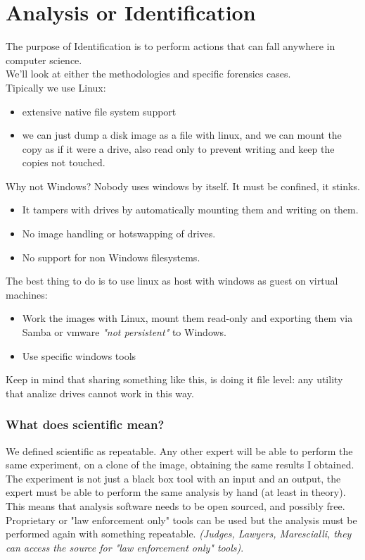 \chapter{Analysis or Identification}
    The purpose of Identification is to perform actions that can fall anywhere in computer science.\\
    We'll look at either the methodologies and specific forensics cases.\\
    Tipically we use Linux:
    \begin{itemize}
        \item extensive native file system support 
        \item we can just dump a disk image as a file with linux, and we can mount the copy as if it were a drive, also read only to prevent writing and keep the copies not touched.
    \end{itemize}
    Why not Windows? Nobody uses windows by itself. It must be confined, it stinks.
    \begin{itemize}
        \item It tampers with drives by automatically mounting them and writing on them.
        \item No image handling or hotswapping of drives.
        \item No support for non Windows filesystems.
    \end{itemize}
    The best thing to do is to use linux as host with windows as guest on virtual machines:
    \begin{itemize}
        \item Work the images with Linux, mount them read-only and exporting them via Samba or vmware \textit{"not persistent"} to Windows.
        \item Use specific windows tools
    \end{itemize}
    Keep in mind that sharing something like this, is doing it file level: any utility that analize drives cannot work in this way.
    \subsection{What does scientific mean?}
        We defined scientific as repeatable. Any other expert will be able to perform the same experiment, on a clone of the image, obtaining the same results I obtained.\\
        The experiment is not just a black box tool with an input and an output, the expert must be able to perform the same analysis by hand (at least in theory). This means that analysis software needs to be open sourced, and possibly free. Proprietary or "law enforcement only" tools can be used but the analysis must be performed again with something repeatable. \textit{(Judges, Lawyers, Marescialli, they can access the source for "law enforcement only" tools)}.
